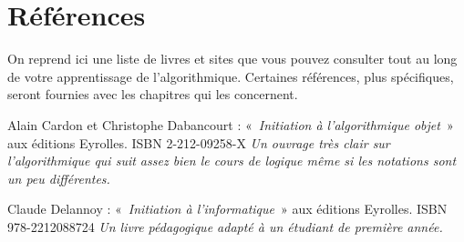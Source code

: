 \section{Références}
	
	On reprend ici une liste de livres et sites que vous pouvez consulter
	tout au long de votre apprentissage de
	l'algorithmique. Certaines références, plus
	spécifiques, seront fournies avec les chapitres qui les concernent.

	\begin{liste}
	\item 
		Alain Cardon et Christophe Dabancourt : «~\textit{Initiation à
		l'algorithmique objet}~» aux éditions Eyrolles. ISBN
		2-212-09258-X
		\textit{Un ouvrage très clair sur l'algorithmique qui
		suit assez bien le cours de logique même si les notations sont un peu
		différentes.}
	\item
		Claude Delannoy : «~\textit{Initiation à
		l'informatique}~» aux éditions Eyrolles. 
		ISBN 978-2212088724
		\textit{Un livre pédagogique adapté à un étudiant de première année.}
	\end{liste}
